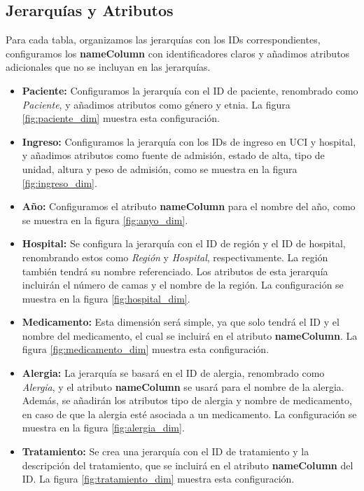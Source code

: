 \documentclass{article}
\begin{document}
\subsection{Jerarquías y Atributos}
Para cada tabla, organizamos las jerarquías con los IDs correspondientes, configuramos los \textbf{nameColumn} con identificadores claros y añadimos atributos adicionales que no se incluyan en las jerarquías.



\begin{itemize}
	\item \textbf{Paciente:} Configuramos la jerarquía con el ID de paciente, renombrado como \textit{Paciente}, y añadimos atributos como género y etnia. La figura \ref{fig:paciente_dim} muestra esta configuración.
	\item \textbf{Ingreso:} Configuramos la jerarquía con los IDs de ingreso en UCI y hospital, y añadimos atributos como fuente de admisión, estado de alta, tipo de unidad, altura y peso de admisión, como se muestra en la figura \ref{fig:ingreso_dim}.
	\item \textbf{Año:} Configuramos el atributo \textbf{nameColumn} para el nombre del año, como se muestra en la figura \ref{fig:anyo_dim}.
	\item \textbf{Hospital:} Se configura la jerarquía con el ID de región y el ID de hospital, renombrando estos como \textit{Región} y \textit{Hospital}, respectivamente. La región también tendrá su nombre referenciado. Los atributos de esta jerarquía incluirán el número de camas y el nombre de la región. La configuración se muestra en la figura \ref{fig:hospital_dim}.
	\item \textbf{Medicamento:} Esta dimensión será simple, ya que solo tendrá el ID y el nombre del medicamento, el cual se incluirá en el atributo \textbf{nameColumn}. La figura \ref{fig:medicamento_dim} muestra esta configuración.
	\item \textbf{Alergia:} La jerarquía se basará en el ID de alergia, renombrado como \textit{Alergia}, y el atributo \textbf{nameColumn} se usará para el nombre de la alergia. Además, se añadirán los atributos tipo de alergia y nombre de medicamento, en caso de que la alergia esté asociada a un medicamento. La configuración se muestra en la figura \ref{fig:alergia_dim}.
	\item \textbf{Tratamiento:} Se crea una jerarquía con el ID de tratamiento y la descripción del tratamiento, que se incluirá en el atributo \textbf{nameColumn} del ID. La figura \ref{fig:tratamiento_dim} muestra esta configuración.
\end{itemize}
\end{document}
